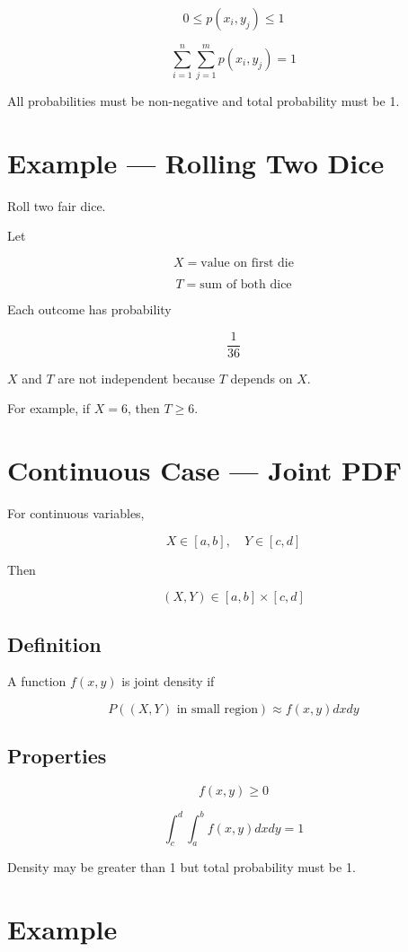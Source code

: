 \documentclass[12pt]{article}
\begin{document}
\[
0 \le p(x_i,y_j) \le 1
\]

\[
\sum_{i=1}^{n} \sum_{j=1}^{m} p(x_i,y_j) = 1
\]

All probabilities must be non-negative and total probability must be 1.


\section{Example --- Rolling Two Dice}

Roll two fair dice.

Let

\[
X = \text{value on first die}
\]

\[
T = \text{sum of both dice}
\]

Each outcome has probability

\[
\frac{1}{36}
\]

$X$ and $T$ are not independent because $T$ depends on $X$.

For example, if $X=6$, then $T \ge 6$.


\section{Continuous Case --- Joint PDF}

For continuous variables,

\[
X \in [a,b], \quad Y \in [c,d]
\]

Then

\[
(X,Y) \in [a,b] \times [c,d]
\]

\subsection{Definition}

A function $f(x,y)$ is joint density if

\[
P((X,Y) \text{ in small region})
\approx f(x,y) dx dy
\]

\subsection{Properties}

\[
f(x,y) \ge 0
\]

\[
\int_c^d \int_a^b f(x,y) dx dy = 1
\]

Density may be greater than 1 but total probability must be 1.


\section{Example}
\end{document}

